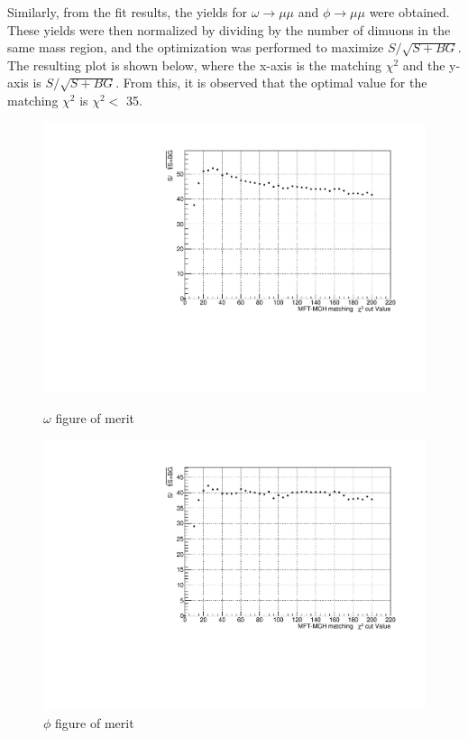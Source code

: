             Similarly, from the fit results, the yields for $\omega \rightarrow \mu\mu$ and $\phi \rightarrow \mu\mu$ were obtained. These yields were then normalized by dividing by the number of dimuons in the same mass region, and the optimization was performed to maximize $S/\sqrt{S+BG}$. The resulting plot is shown below, where the x-axis is the matching $\chi^2$ and the y-axis is $S/\sqrt{S+BG}$. From this, it is observed that the optimal value for the matching $\chi^2$ is $\chi^2 <$ 35.

            \begin{figure}[htbp]
                \centering
                \begin{minipage}{0.45\textwidth} %
                    \centering
                    \includegraphics[width=\textwidth]{fig/3_4_4_omega_significance.pdf} %
                    \caption{$\omega$ figure of merit}
                    \label{fig:omega_significance}
                \end{minipage}
                \hfill
                \begin{minipage}{0.45\textwidth}
                    \centering
                    \includegraphics[width=\textwidth]{fig/3_4_4_phi_significance.pdf} %
                    \caption{$\phi$ figure of merit}
                    \label{fig:phi_significance}
                \end{minipage}
            \end{figure}
